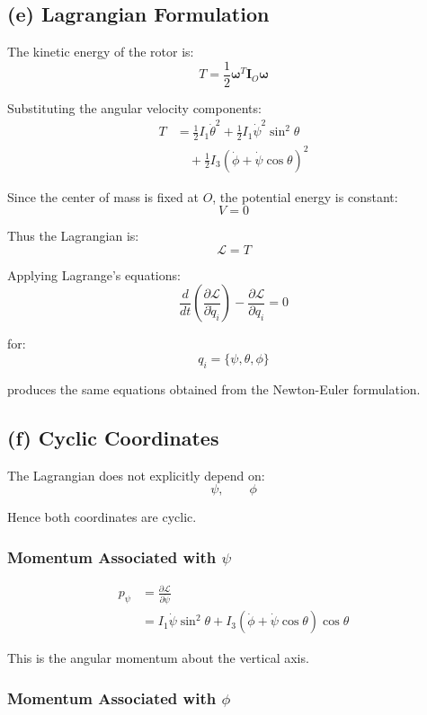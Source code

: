 \subsection*{(e) Lagrangian Formulation}

The kinetic energy of the rotor is:
\[
T
=
\frac12\bm{\omega}^T\mathbf{I}_O\bm{\omega}
\]

Substituting the angular velocity components:
\begin{align}
T
&=
\frac12 I_1\dot\theta^2
+
\frac12 I_1\dot\psi^2\sin^2\theta
\\
&\quad
+
\frac12 I_3(\dot\phi+\dot\psi\cos\theta)^2
\end{align}

Since the center of mass is fixed at $O$, the potential energy is constant:
\[
V = 0
\]

Thus the Lagrangian is:
\[
\mathcal{L}=T
\]

Applying Lagrange's equations:
\[
\frac{d}{dt}
\left(
\frac{\partial\mathcal{L}}{\partial\dot q_i}
\right)
-
\frac{\partial\mathcal{L}}{\partial q_i}
=0
\]

for:
\[
q_i = \{\psi,\theta,\phi\}
\]

produces the same equations obtained from the Newton-Euler formulation.

\subsection*{(f) Cyclic Coordinates}

The Lagrangian does not explicitly depend on:
\[
\psi,
\qquad
\phi
\]

Hence both coordinates are cyclic.

\subsubsection*{Momentum Associated with $\psi$}

\begin{align}
p_\psi
&=
\frac{\partial\mathcal{L}}{\partial\dot\psi}
\\
&=
I_1\dot\psi\sin^2\theta
+
I_3(\dot\phi+\dot\psi\cos\theta)\cos\theta
\end{align}

This is the angular momentum about the vertical axis.

\subsubsection*{Momentum Associated with $\phi$}

